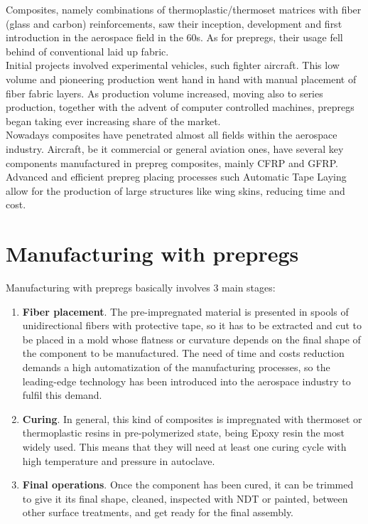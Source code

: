 Composites, namely combinations of thermoplastic/thermoset matrices with fiber
(glass and carbon) reinforcements, saw their inception, development and first
introduction in the aerospace field in the 60s. As for prepregs, their usage fell
behind of conventional laid up fabric.\\

Initial projects involved experimental vehicles, such fighter aircraft. This low
volume and pioneering production went hand in hand with manual placement of fiber
fabric layers. As production volume increased, moving also to series production,
together with the advent of computer controlled machines, prepregs began taking
ever increasing share of the market.\\

Nowadays composites have penetrated almost all fields within the aerospace industry.
Aircraft, be it commercial or general aviation ones, have several key components
manufactured in prepreg composites, mainly CFRP and GFRP. Advanced and efficient
prepreg placing processes such Automatic Tape Laying allow for the production
of large structures like wing skins, reducing time and cost.\\

\section{Manufacturing with prepregs}


Manufacturing with prepregs basically involves 3 main stages:

\begin{enumerate}
\item\textbf{Fiber placement}. The pre-impregnated material is presented in spools of unidirectional fibers with protective tape, so it has to be extracted and cut to be placed in a mold whose flatness or curvature depends on the final shape of the component to be manufactured. The need of time and costs reduction demands a high automatization of the manufacturing processes, so the leading-edge technology has been introduced into the aerospace industry to fulfil this demand.
\item\textbf{Curing}. In general, this kind of composites is impregnated with thermoset or thermoplastic resins in pre-polymerized state, being Epoxy resin the most widely used. This means that they will need at least one curing cycle with high temperature and pressure in autoclave.
\item\textbf{Final operations}. Once the component has been cured, it can be trimmed to give it its final shape, cleaned, inspected with NDT or painted, between other surface treatments, and get ready for the final assembly.
\end{enumerate}

